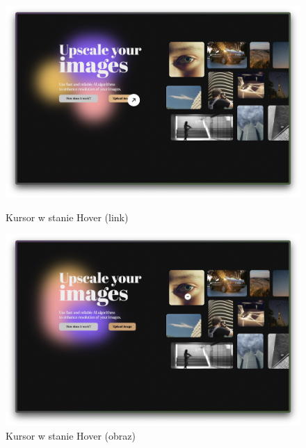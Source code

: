 \begin{figure}[ht]
    \centering
    \begin{minipage}[t]{0.47\linewidth}
        \includegraphics[width=\linewidth]{Rozdziały/06.Aplikacja/Obrazy/kursor-link.jpg}
        \caption{Kursor w stanie Hover (link)}
        \label{fig:image89}
    \end{minipage}
    \hspace{0.5cm}
    \begin{minipage}[t]{0.47\linewidth}
        \includegraphics[width=\linewidth]{Rozdziały/06.Aplikacja/Obrazy/kursor-scrabb.jpg}
        \caption{Kursor w stanie Hover (obraz)}
        \label{fig:image90}
    \end{minipage}
\end{figure}

